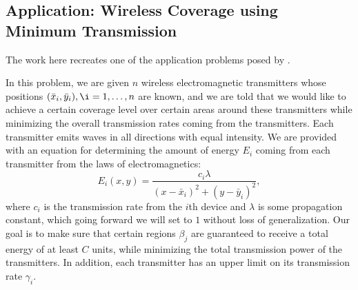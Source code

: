 	\subsection{Application: Wireless Coverage using Minimum Transmission}
	
	The work here recreates one of the application problems posed by \cite{Ahmadi2016a}.
	
	In this problem, we are given $n$ wireless electromagnetic transmitters whose positions $(\bar{x}_i , \bar{y}_i), \i = 1, \dots, n$ are known, and we are told that we would like to achieve a certain coverage level over certain areas around these transmitters while minimizing the overall transmission rates coming from the transmitters. Each transmitter emits waves in all directions with equal intensity. We are provided with an equation for determining the amount of energy $E_i$ coming from each transmitter from the laws of electromagnetics:
	$$
	E_i (x,y) = \frac{c_i \lambda}{(x - \bar{x}_i)^2 + (y - \bar{y}_i)^2},
	$$
	where $c_i$ is the transmission rate from the $i$th device and $\lambda$ is some propagation constant, which going forward we will set to $1$ without loss of generalization. Our goal is to make sure that certain regions $\beta_j$ are guaranteed to receive a total energy of at least $C$ units, while minimizing the total transmission power of the transmitters. In addition, each transmitter has an upper limit on its transmission rate $\gamma_i$.
	
